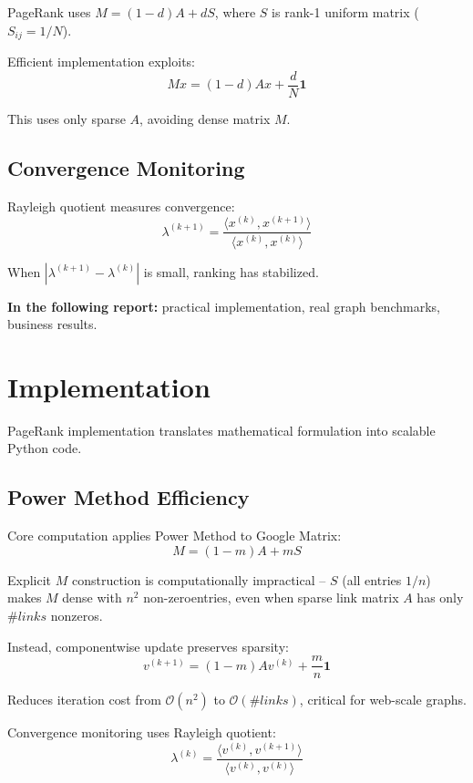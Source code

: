 \documentclass[11pt]{article}
\begin{document}
PageRank uses $M = (1-d)A + dS$, where $S$ is rank-1 uniform matrix ($S_{ij} = 1/N$).

Efficient implementation exploits:
$$Mx = (1-d)Ax + \frac{d}{N}\mathbf{1}$$

This uses only sparse $A$, avoiding dense matrix $M$.

\subsection*{Convergence Monitoring}

Rayleigh quotient measures convergence:
$$\lambda^{(k+1)} = \frac{\langle x^{(k)}, x^{(k+1)}\rangle}{\langle x^{(k)}, x^{(k)}\rangle}$$

When $|\lambda^{(k+1)}-\lambda^{(k)}|$ is small, ranking has stabilized.

\noindent \textbf{In the following report:} practical implementation, real graph benchmarks, business results.









\newpage
\section{Implementation}

PageRank implementation translates mathematical formulation into scalable Python code.

\subsection{Power Method Efficiency}

Core computation applies Power Method to Google Matrix:
$$M = (1-m)A + mS$$

Explicit $M$ construction is computationally impractical -- $S$ (all entries $1/n$) makes $M$ dense with $n^2$ non-zeroentries, even when sparse link matrix $A$ has only $\#links$ nonzeros.

Instead, componentwise update preserves sparsity:
$$v^{(k+1)} = (1-m)A v^{(k)} + \frac{m}{n}\mathbf{1}$$

Reduces iteration cost from $\mathcal{O}(n^2)$ to $\mathcal{O}(\#links)$, critical for web-scale graphs.

Convergence monitoring uses Rayleigh quotient:
$$\lambda^{(k)} = \frac{\langle v^{(k)}, v^{(k+1)} \rangle}{\langle v^{(k)}, v^{(k)} \rangle}$$
\end{document}

